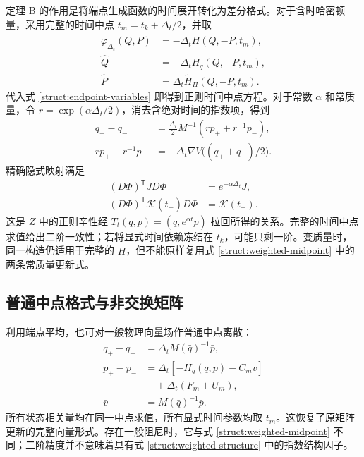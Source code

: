 定理 B 的作用是将端点生成函数的时间展开转化为差分格式。对于含时哈密顿量，采用完整的时间中点 $t_m=t_k+\Delta_t/2$，并取
\begin{equation}\label{struct:lifted-generator}
\begin{aligned}
 \varphi_{\Delta_t}(Q,P)&=-\Delta_t\widetilde H(Q,-P,t_m),\\
 \widehat Q&=-\Delta_t\widetilde H_q(Q,-P,t_m),\\
 \widehat P&=\Delta_t\widetilde H_\Pi(Q,-P,t_m).
\end{aligned}
\end{equation}
代入式 \eqref{struct:endpoint-variables} 即得到正则时间中点方程。对于常数 $\alpha$ 和常质量，令 $r=\exp(\alpha\Delta_t/2)$，消去含绝对时间的指数项，得到
\begin{equation}\label{struct:weighted-midpoint}
\begin{aligned}
 q_+-q_-&=\tfrac{\Delta_t}{2}M^{-1}(r p_++r^{-1}p_-),\\
 r p_+-r^{-1}p_-&=-\Delta_t\nabla V\bigl((q_++q_-)/2\bigr).
\end{aligned}
\end{equation}
精确隐式映射满足
\begin{equation}\label{struct:weighted-structure}
\begin{aligned}
 (D\Phi)^{\mathsf T}J D\Phi&=e^{-\alpha\Delta_t}J,\\
 (D\Phi)^{\mathsf T}\mathcal K(t_+)D\Phi&=\mathcal K(t_-).
\end{aligned}
\end{equation}
这是 $Z$ 中的正则辛性经 $T_t(q,p)=(q,e^{\alpha t}p)$ 拉回所得的关系。完整的时间中点求值给出二阶一致性；若将显式时间依赖冻结在 $t_k$，可能只剩一阶。变质量时，同一构造仍适用于完整的 $\widetilde H$，但不能原样复用式 \eqref{struct:weighted-midpoint} 中的两条常质量更新式。

\subsection{普通中点格式与非交换矩阵}
\label{struct:matrix-section}

利用端点平均，也可对一般物理向量场作普通中点离散：
\begin{equation}\label{struct:mechanical-midpoint}
\begin{aligned}
 q_+-q_-&=\Delta_t M(\bar q)^{-1}\bar p,\\
 p_+-p_-&=\Delta_t[-H_q(\bar q,\bar p)-C_m\bar v]\\
           &\quad+\Delta_t(F_m+U_m),\\
 \bar v&=M(\bar q)^{-1}\bar p.
\end{aligned}
\end{equation}
所有状态相关量均在同一中点求值，所有显式时间参数均取 $t_m$。这恢复了原矩阵更新的完整向量形式。存在一般阻尼时，它与式 \eqref{struct:weighted-midpoint} 不同；二阶精度并不意味着具有式 \eqref{struct:weighted-structure} 中的指数结构因子。

